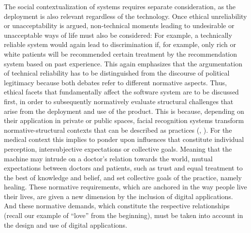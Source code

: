 \documentclass[manuscript,screen]{acmart}
\begin{document}
The social contextualization of systems requires separate consideration, as the deployment is also relevant regardless of the technology. Once ethical unreliability or unacceptability is argued, non-technical moments leading to undesirable or unacceptable ways of life must also be considered: For example, a technically reliable system would again lead to discrimination if, for example, only rich or white patients will be recommended certain treatment by the recommendation system based on past experience. This again emphasizes that the argumentation of technical reliability has to be distinguished from the discourse of political legitimacy because both debates refer to different normative aspects. Thus, ethical facets that fundamentally affect the software system are to be discussed first, in order to subsequently normatively evaluate structural challenges that arise from the deployment and use of the product. This is because, depending on their application in private or public spaces, facial recognition systems transform normative-structural contexts that can be described as practices (\citep{nida2019structural}, \citep{knauff2021handbook}). For the medical context this implies to ponder upon influences that constitute individual perception, intersubjective expectations or collective goals. Meaning that the machine may intrude on a doctor's relation towards the world, mutual expectations between doctors and patients, such as trust and equal treatment to the best of knowledge and belief, and set collective goals of the practice, namely healing. These normative requirements, which are anchored in the way people live their lives, are given a new dimension by the inclusion of digital applications. And these normative demands, which constitute the respective relationships (recall our example of ``love'' from the beginning), must be taken into account in the design and use of digital applications. 
\end{document}
